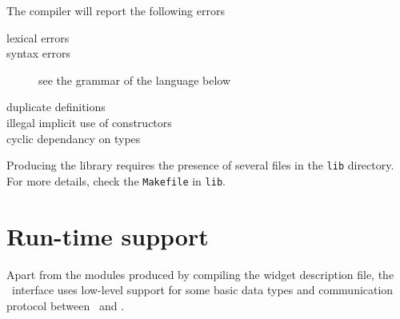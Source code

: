 The compiler will report the following errors
\begin{description}
\item[lexical errors]
\item[syntax errors] see the grammar of the language below
\item[duplicate definitions]
\item[illegal implicit use of constructors]
\item[cyclic dependancy on types]
\end{description} 

Producing the library requires the presence of several files in the
\verb|lib| directory. For more details, check the \verb|Makefile| in
\verb|lib|. 

\section{Run-time support}
Apart from the modules produced by compiling the widget description file,
the \camltk\ interface uses low-level support for some basic data types and
communication protocol between \caml\ and \tcl.

